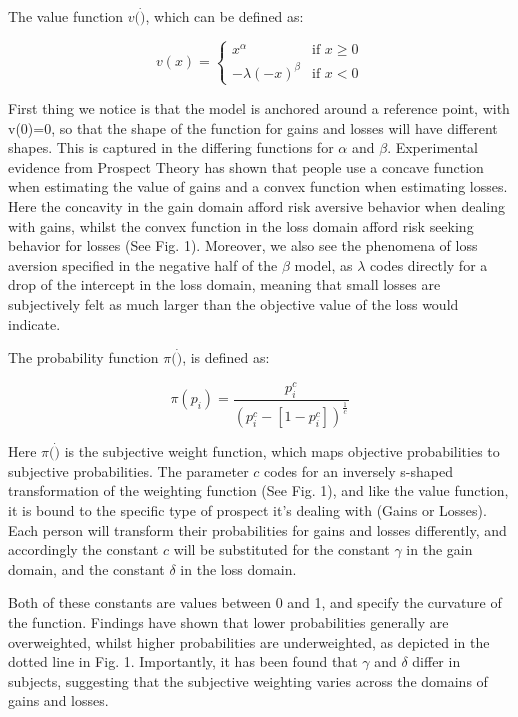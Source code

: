 \documentclass{article}
\begin{document}
    The value function $v(\dot)$, which can be defined as:

    $$v(x) = \begin{cases}
        x^\alpha & \text{if } x \geq 0 \\
        -\lambda(-x)^\beta & \text{if } x < 0 
    \end{cases}$$

    First thing we notice is that the model is anchored around a reference point, with v(0)=0, so that the shape of the function for gains and losses will have different shapes. This is captured in the differing functions for $\alpha$ and $\beta$.
Experimental evidence from Prospect Theory has shown that people use a concave function when estimating the value of gains and a convex function when estimating losses. Here the concavity in the gain domain afford risk aversive behavior when dealing with gains, whilst the convex function in the loss domain afford risk seeking behavior for losses (See Fig. 1).
Moreover, we also see the phenomena of loss aversion specified in the negative half of the $\beta$ model, as $\lambda$ codes directly for a drop of the intercept in the loss domain, meaning that small losses are subjectively felt as much larger than the objective value of the loss would indicate.

The probability function $\pi(\dot)$, is defined as:

$$\pi(p_i) = \frac{p_i^c}{(p_i^c-[1-p_i^c])^\frac{1}{c}}$$

Here $\pi(\dot)$ is the subjective weight function, which maps objective probabilities to subjective probabilities. The parameter $c$ codes for an inversely s-shaped transformation of the weighting function (See Fig. 1), and like the value function, it is bound to the specific type of prospect it’s dealing with (Gains or Losses). Each person will transform their probabilities for gains and losses differently, and accordingly the constant $c$ will be substituted for the constant $\gamma$ in the gain domain, and the constant $\delta$ in the loss domain.

Both of these constants are values between 0 and 1, and specify the curvature of the function.
Findings have shown that lower probabilities generally are overweighted, whilst higher probabilities are underweighted, as depicted in the dotted line in Fig. 1.  Importantly, it has been found that $\gamma$ and $\delta$ differ in subjects, suggesting that the subjective weighting varies across the domains of gains and losses.
\end{document}
